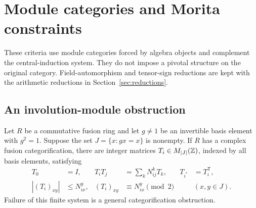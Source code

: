\section{Module categories and Morita constraints}\label{sec:newalgebra}
These criteria use module categories forced by algebra objects and
complement the central-induction system. They do not impose a pivotal
structure on the original category. Field-automorphism and tensor-sign
reductions are kept with the arithmetic reductions in
Section~\ref{sec:reductions}.

\subsection{An involution-module obstruction}
\begin{theorem}\label{thm:involution}
Let $R$ be a commutative fusion ring and let $g\ne1$ be an invertible basis
element with $g^2=1$. Suppose the set $J=\{x:gx=x\}$ is nonempty. If $R$
has a complex fusion categorification, there are integer matrices
$T_i\in M_{|J|}(\mathbb Z)$, indexed by all basis elements, satisfying
\begin{align}
 T_0&=I,&T_iT_j&=\sum_kN_{ij}^kT_k,&T_{i^*}&=T_i^{\mathsf T},\label{eq:module-rep}\\
 |(T_i)_{xy}|&\le N_{ix}^{y},&
 (T_i)_{xy}&\equiv N_{ix}^{y}\pmod2 &&(x,y\in J).\label{eq:module-bound}
\end{align}
Failure of this finite system is a general categorification obstruction.
\end{theorem}
